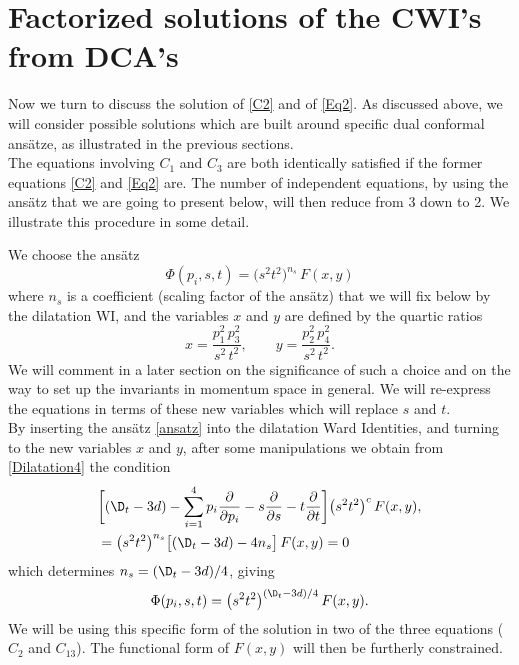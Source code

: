 \documentclass[a4paper,11pt,openright,twoside]{book}
\numberwithin{equation}{section}
\begin{document}
{%
\section{Factorized solutions of the CWI's  from DCA's}
Now we turn to discuss the solution of \eqref{C2} and of \eqref{Eq2}. As discussed above, we will consider possible solutions which are built around specific dual conformal ans\"atze, as illustrated in the previous sections. \\
The  equations involving $C_1$ and $C_3$ are both identically satisfied if the former equations \eqref{C2} and \eqref{Eq2} are. The number of independent equations, by using the ans\"atz that we are going to present below, will then reduce from 3 down to 2. We illustrate this procedure in some detail.

We choose  the ans\"atz
\begin{equation}
	\Phi(p_i,s,t)=\big(s^2t^2\big)^{n_s}\,F(x,y)\label{ansatz}
\end{equation}
where $n_s$ is a coefficient (scaling factor of the ans\"atz) that we will fix below by the dilatation WI, and the variables $x$ and $y$ are defined by the quartic ratios
\begin{equation}
	x=\frac{p_1^2\,p_3^2}{s^2\,t^2},\qquad y=\frac{p_2^2\,p_4^2}{s^2\,t^2}.
\end{equation}
We will comment in a later section on the significance of such a choice and on the way to set up the invariants in momentum space in general. We will re-express the equations in terms of these new variables which will replace $s$ and $t$.\\
By inserting the ans\"atz \eqref{ansatz} into the dilatation Ward Identities, and turning to the new variables $x$ and $y$, after some manipulations we obtain from \eqref{Dilatation4} the condition
\begin{align}
	\label{dil1}
	&\bigg[(\D_t-3d)-\sum_{i=1}^4p_i\frac{\partial}{\partial p_i}-s\frac{\partial}{\partial s}-t\frac{\partial}{\partial t}\bigg]\big(s^2t^2\big)^{c}\,F(x,y),\notag\\
	&=\big(s^2t^2\big)^{n_s}\big[(\D_t-3d)-4 n_s\big] \,F(x,y)=0
\end{align}
which determines $n_s=(\D_t-3d)/4$, giving
\begin{equation}
	\Phi(p_i,s,t)=\big(s^2t^2\big)^{(\D_t-3d)/4}\,F(x,y).\label{ansatz2}
\end{equation}
We will be using this specific form of the solution in two of the three equations ($C_2$ and $C_{13}$). The functional form of $F(x,y)$ will then be furtherly constrained. 

}
\end{document}
